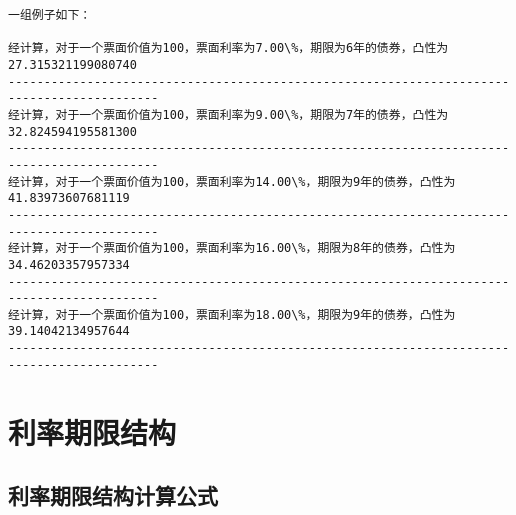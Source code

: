 \documentclass[11pt]{article}
\begin{document}
    \begin{Verbatim}[commandchars=\\\{\}]
一组例子如下：

经计算，对于一个票面价值为100，票面利率为7.00\%，期限为6年的债券，凸性为27.315321199080740
-------------------------------------------------------------------------------------------
经计算，对于一个票面价值为100，票面利率为9.00\%，期限为7年的债券，凸性为32.824594195581300
-------------------------------------------------------------------------------------------
经计算，对于一个票面价值为100，票面利率为14.00\%，期限为9年的债券，凸性为41.83973607681119
-------------------------------------------------------------------------------------------
经计算，对于一个票面价值为100，票面利率为16.00\%，期限为8年的债券，凸性为34.46203357957334
-------------------------------------------------------------------------------------------
经计算，对于一个票面价值为100，票面利率为18.00\%，期限为9年的债券，凸性为39.14042134957644
-------------------------------------------------------------------------------------------

    \end{Verbatim}

    \section{利率期限结构}\label{ux5229ux7387ux671fux9650ux7ed3ux6784}

    \subsection{利率期限结构计算公式}\label{ux5229ux7387ux671fux9650ux7ed3ux6784ux8ba1ux7b97ux516cux5f0f}
\end{document}
